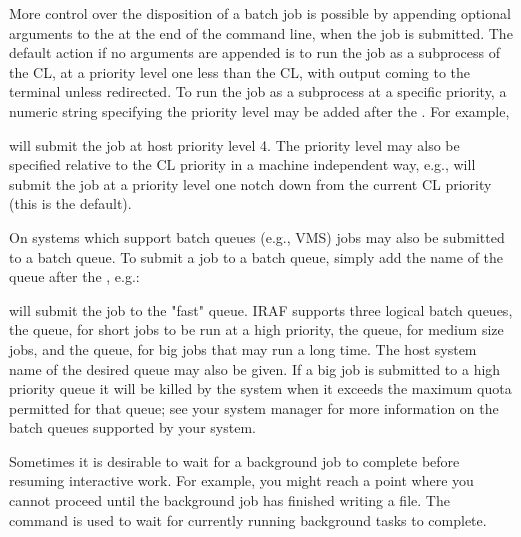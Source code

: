 More control over the disposition of a batch job is possible by appending
optional arguments to the \usertype{\&} at the end of the command line,
when the job is submitted.  The default action if no arguments are appended
is to run the job as a subprocess of the CL, at a priority level one less
than the CL, with output coming to the terminal unless redirected.
To run the job as a subprocess at a specific priority, a numeric string
specifying the  priority level may be added after
the \usertype{\&}.  For example,

\begin{quotation}\noindent
{} 
\end{quotation}

\noindent
will submit the job at host priority level 4.  The priority level may also
be specified relative to the CL priority in a machine independent way,
e.g.,  will submit the job at a priority level one notch
down from the current CL priority (this is the default).

On systems which support batch queues (e.g., VMS) jobs may also be submitted
to a batch queue.  To submit a job to a batch queue, simply add the name of
the queue after the \usertype{\&}, e.g.:

\begin{quotation}\noindent
{} 
\end{quotation}

\noindent
will submit the job to the "fast" queue.  IRAF supports three logical batch
queues, the  queue, for short jobs to be run at a high priority,
the  queue, for medium size jobs, and the 
queue, for big jobs that may run a long time.  The host system name of the
desired queue may also be given.  If a big job is submitted to a high priority
queue it will be killed by the system when it exceeds the maximum quota
permitted for that queue; see your system manager for more information on
the batch queues supported by your system.

Sometimes it is desirable to wait for a background job to complete before
resuming interactive work.  For example, you might reach a point where
you cannot proceed until the background job has finished writing a file.
The  command is used to wait for currently running
background tasks to complete.

\begin{quotation}\noindent
{} 
\end{quotation}

